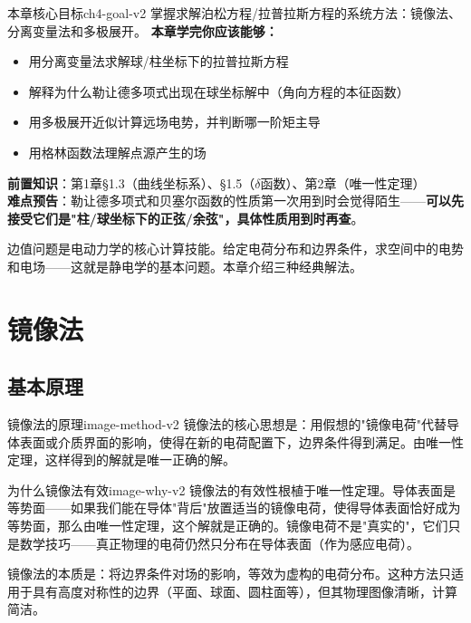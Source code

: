 \documentclass[11pt,a4paper,openany,oneside]{book}
\begin{document}
\hypertarget{ch4-goal}{}\begin{insight}{本章核心目标}{ch4-goal-v2}
掌握求解泊松方程/拉普拉斯方程的系统方法：镜像法、分离变量法和多极展开。
\tcblower
\textbf{本章学完你应该能够：}
\begin{itemize}[label=$\square$]
\item 用分离变量法求解球/柱坐标下的拉普拉斯方程
\item 解释为什么勒让德多项式出现在球坐标解中（角向方程的本征函数）
\item 用多极展开近似计算远场电势，并判断哪一阶矩主导
\item 用格林函数法理解点源产生的场
\end{itemize}

\textbf{前置知识}：第1章\S1.3（曲线坐标系）、\S1.5（$\delta$函数）、第2章（唯一性定理）\\
\textbf{难点预告}：勒让德多项式和贝塞尔函数的性质第一次用到时会觉得陌生——\textbf{可以先接受它们是"柱/球坐标下的正弦/余弦"，具体性质用到时再查}。
\end{insight}

边值问题是电动力学的核心计算技能。给定电荷分布和边界条件，求空间中的电势和电场——这就是静电学的基本问题。本章介绍三种经典解法。

\section{镜像法}

\subsection{基本原理}

\begin{theorem}{镜像法的原理}{image-method-v2}
镜像法的核心思想是：用假想的"镜像电荷"代替导体表面或介质界面的影响，使得在新的电荷配置下，边界条件得到满足。由唯一性定理，这样得到的解就是唯一正确的解。
\end{theorem}

\begin{insight}{为什么镜像法有效}{image-why-v2}
镜像法的有效性根植于唯一性定理。导体表面是等势面——如果我们能在导体"背后"放置适当的镜像电荷，使得导体表面恰好成为等势面，那么由唯一性定理，这个解就是正确的。镜像电荷不是"真实的"，它们只是数学技巧——真正物理的电荷仍然只分布在导体表面（作为感应电荷）。

镜像法的本质是：将边界条件对场的影响，等效为虚构的电荷分布。这种方法只适用于具有高度对称性的边界（平面、球面、圆柱面等），但其物理图像清晰，计算简洁。
\end{insight}
\end{document}
